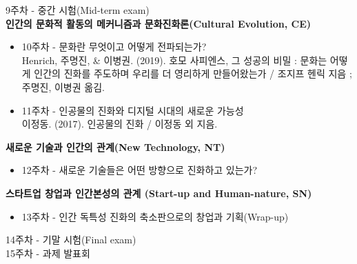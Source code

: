 \documentclass[11pt,letterpaper]{article}
\newcommand{\lefthead}[2]{\noindent\textbf{#1}\hfill\\[#2]}
\begin{document}
\noindent 9주차 - 중간 시험(Mid-term exam) \\

\noindent \textbf{인간의 문화적 활동의 메커니즘과 문화진화론(Cultural Evolution, CE)}
        \begin{itemize}
        \item 10주차 - 문화란 무엇이고 어떻게 전파되는가?\\
        Henrich, 주명진, \& 이병권. (2019). 호모 사피엔스, 그 성공의 비밀 : 문화는 어떻게 인간의 진화를 주도하며 우리를 더 영리하게 만들어왔는가 / 조지프 헨릭 지음 ; 주명진, 이병권 옮김.
        \item 11주차 - 인공물의 진화와 디지털 시대의 새로운 가능성 \\
        이정동. (2017). 인공물의 진화 / 이정동 외 지음.
		\end{itemize} \vspace{0.3cm}
\noindent \textbf{새로운 기술과 인간의 관계(New Technology, NT)}
        \begin{itemize}
        \item 12주차 - 새로운 기술들은 어떤 방향으로 진화하고 있는가?\\ 
		\end{itemize} \vspace{0.3cm}	
\noindent \textbf{스타트업 창업과 인간본성의 관계 (Start-up and Human-nature, SN)}
        \begin{itemize}
        \item 13주차 - 인간 독특성 진화의 축소판으로의 창업과 기획(Wrap-up)\\
		\end{itemize} \vspace{0.3cm}		

\noindent 14주차 - 기말 시험(Final exam) \\

\noindent 15주차 - 과제 발표회 \\

\end{document}
